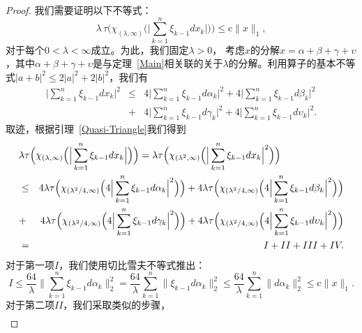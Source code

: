 \begin{proof}
  我们需要证明以下不等式：
  \begin{equation}\label{transform-Ineq}
  \lambda \, \tau \Big( \chi_{(\lambda,\infty)} \Big( \Big|
  \sum_{k=1}^n \xi_{k-1} dx_k \Big| \Big)\Big) \le \mathrm{c}
  \|x\|_1,
  \end{equation}
  对于每个$0 < \lambda < \infty$成立。为此，我们固定$\lambda > 0$，
  考虑$x$的分解$x = \alpha + \beta + \gamma +\upsilon$，其中$\alpha + \beta + \gamma
  +\upsilon$是与定理~\ref{Main}相关联的关于$\lambda$的分解。利用算子的基本不等式$|a+b|^2 \le 2 |a|^2 + 2 |b|^2$，我们有
  \begin{eqnarray*}
  \Big|\sum_{k=1}^n \xi_{k-1} dx_k \Big|^2 & \le & 4
  \Big|\sum_{k=1}^n \xi_{k-1} d\alpha_k \Big|^2 + 4
  \Big|\sum_{k=1}^n \xi_{k-1} d\beta_k \Big|^2 \\ & + & 4 \Big|
  \sum_{k=1}^n \xi_{k-1} d\gamma_k \Big|^2 + 4 \Big| \sum_{k=1}^n
  \xi_{k-1} d\upsilon_k \Big|^2.
  \end{eqnarray*}
  取迹，根据引理~\ref{Quasi-Triangle}我们得到
  \begin{eqnarray*}
  \lefteqn{\lambda \tau \Big( \chi_{(\lambda,\infty)} \Big( \Big|
  \sum_{k=1}^n \xi_{k-1} dx_k \Big| \Big) \Big)=\lambda  \tau \Big(
  \chi_{(\lambda^2,\infty)} \Big( \Big| \sum_{k=1}^n \xi_{k-1} dx_k
  \Big|^2 \Big)\Big)} \\ & \le &  4 \lambda  \tau \Big(
  \chi_{(\lambda^2/4,\infty)} \Big( 4 \Big| \sum_{k=1}^n \xi_{k-1}
  d\alpha_k \Big|^2 \Big)\Big) +  4 \lambda  \tau \Big(
  \chi_{(\lambda^2/4,\infty)} \Big( 4 \Big| \sum_{k=1}^n \xi_{k-1}
  d\beta_k \Big|^2 \Big)\Big) \\ & + &  4 \lambda  \tau \Big(
  \chi_{(\lambda^2/4,\infty)} \Big( 4 \Big| \sum_{k=1}^n \xi_{k-1}
  d\gamma_k \Big|^2 \Big)\Big) +  4 \lambda  \tau \Big(
  \chi_{(\lambda^2/4,\infty)} \Big( 4 \Big| \sum_{k=1}^n \xi_{k-1}
  d\upsilon_k \Big|^2 \Big)\Big) \\ & = & I + II + III +IV.
  \end{eqnarray*}
  对于第一项$I$，我们使用切比雪夫不等式推出：
  \begin{equation} \label{I}
  I \le \frac{64}{\lambda} \Big\| \sum_{k=1}^n \xi_{k-1} d\alpha_k
  \Big\|_2^2 = \frac{64}{\lambda}  \sum_{k=1}^n \|\xi_{k-1}
  d\alpha_k \|_2^2 \le \frac{64}{\lambda} \sum_{k=1}^n
  \|d\alpha_k\|_2^2 \leq \mathrm{c} \|x\|_1.
  \end{equation}
  对于第二项$II$，我们采取类似的步骤，
  \begin{eqnarray} \label{II}

\end{eqnarray}
\end{proof}
